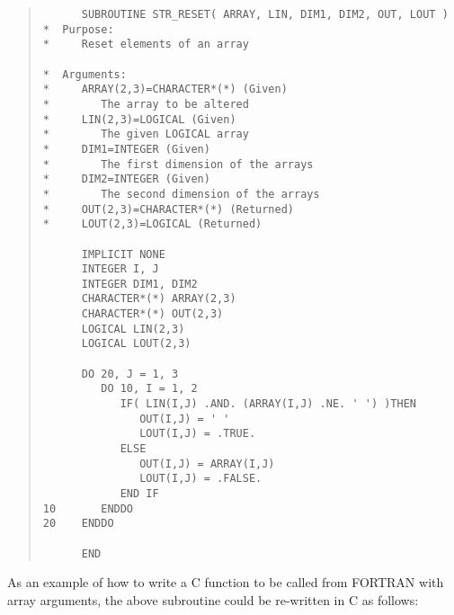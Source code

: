 \documentclass[twoside,11pt]{article}
\renewcommand{\_}{\texttt{\symbol{95}}}
\begin{document}
{\small \begin{quote} \begin{verbatim}
      SUBROUTINE STR_RESET( ARRAY, LIN, DIM1, DIM2, OUT, LOUT )
*  Purpose:
*     Reset elements of an array

*  Arguments:
*     ARRAY(2,3)=CHARACTER*(*) (Given)
*        The array to be altered
*     LIN(2,3)=LOGICAL (Given)
*        The given LOGICAL array
*     DIM1=INTEGER (Given)
*        The first dimension of the arrays
*     DIM2=INTEGER (Given)
*        The second dimension of the arrays
*     OUT(2,3)=CHARACTER*(*) (Returned)
*     LOUT(2,3)=LOGICAL (Returned)

      IMPLICIT NONE
      INTEGER I, J
      INTEGER DIM1, DIM2
      CHARACTER*(*) ARRAY(2,3)
      CHARACTER*(*) OUT(2,3)
      LOGICAL LIN(2,3)
      LOGICAL LOUT(2,3)
      
      DO 20, J = 1, 3
         DO 10, I = 1, 2
            IF( LIN(I,J) .AND. (ARRAY(I,J) .NE. ' ') )THEN
               OUT(I,J) = ' '
               LOUT(I,J) = .TRUE.
            ELSE
               OUT(I,J) = ARRAY(I,J)
               LOUT(I,J) = .FALSE.
            END IF
10       ENDDO
20    ENDDO

      END
\end{verbatim} \end{quote} }

As an example of how to write a C function to be called from FORTRAN with array
arguments, the above subroutine could be re-written in C as follows:
\end{document}
